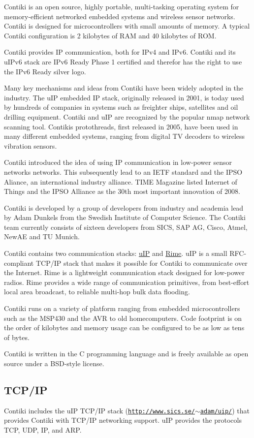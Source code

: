 Contiki is an open source, highly portable, multi-\/tasking operating system for memory-\/efficient networked embedded systems and wireless sensor networks. Contiki is designed for microcontrollers with small amounts of memory. A typical Contiki configuration is 2 kilobytes of R\+AM and 40 kilobytes of R\+OM.

Contiki provides IP communication, both for I\+Pv4 and I\+Pv6. Contiki and its u\+I\+Pv6 stack are I\+Pv6 Ready Phase 1 certified and therefor has the right to use the I\+Pv6 Ready silver logo.

Many key mechanisms and ideas from Contiki have been widely adopted in the industry. The u\+IP embedded IP stack, originally released in 2001, is today used by hundreds of companies in systems such as freighter ships, satellites and oil drilling equipment. Contiki and u\+IP are recognized by the popular nmap network scanning tool. Contiki\textquotesingle{}s protothreads, first released in 2005, have been used in many different embedded systems, ranging from digital TV decoders to wireless vibration sensors.

Contiki introduced the idea of using IP communication in low-\/power sensor networks networks. This subsequently lead to an I\+E\+TF standard and the I\+P\+SO Aliance, an international industry alliance. T\+I\+ME Magazine listed Internet of Things and the I\+P\+SO Alliance as the 30th most important innovation of 2008.

Contiki is developed by a group of developers from industry and academia lead by Adam Dunkels from the Swedish Institute of Computer Science. The Contiki team currently consists of sixteen developers from S\+I\+CS, S\+AP AG, Cisco, Atmel, New\+AE and TU Munich.

Contiki contains two communication stacks\+: \hyperlink{a00074}{u\+IP} and \hyperlink{a00068}{Rime}. u\+IP is a small R\+F\+C-\/compliant T\+C\+P/\+IP stack that makes it possible for Contiki to communicate over the Internet. Rime is a lightweight communication stack designed for low-\/power radios. Rime provides a wide range of communication primitives, from best-\/effort local area broadcast, to reliable multi-\/hop bulk data flooding.

Contiki runs on a variety of platform ranging from embedded microcontrollers such as the M\+S\+P430 and the A\+VR to old homecomputers. Code footprint is on the order of kilobytes and memory usage can be configured to be as low as tens of bytes.

Contiki is written in the C programming language and is freely available as open source under a B\+S\+D-\/style license.\hypertarget{index_contiki-mainpage-tcpip}{}\subsection{T\+C\+P/\+IP}\label{index_contiki-mainpage-tcpip}
Contiki includes the u\+IP T\+C\+P/\+IP stack (\href{http://www.sics.se/~adam/uip/}{\tt http\+://www.\+sics.\+se/$\sim$adam/uip/}) that provides Contiki with T\+C\+P/\+IP networking support. u\+IP provides the protocols T\+CP, U\+DP, IP, and A\+RP.

